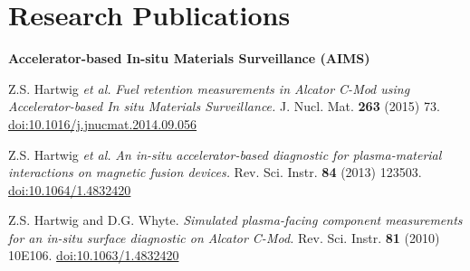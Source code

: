 \documentclass[10pt]{article}
\begin{document}
\section{Research Publications}
\textbf{Accelerator-based In-situ Materials Surveillance (AIMS)}
\begin{innerlist}

\item Z.S. Hartwig \textit{et al.} \textit{Fuel retention measurements
  in Alcator C-Mod using Accelerator-based In situ Materials
  Surveillance.} J. Nucl. Mat. \textbf{263} (2015) 73.
  \href{http://dx.doi.org/10.1016/j.jnucmat.2014.09.056}{doi:10.1016/j.jnucmat.2014.09.056}
  \vspace{0.2cm}

\item Z.S. Hartwig \textit{et al.} \textit{An in-situ
  accelerator-based diagnostic for plasma-material interactions on
  magnetic fusion devices.} Rev. Sci. Instr. \textbf{84} (2013)
  123503.
  \href{http://dx.doi.org/10.1063/1.4832420}{doi:10.1064/1.4832420}
  \vspace{0.2cm}

\item Z.S. Hartwig and D.G. Whyte. \textit{Simulated plasma-facing
  component measurements for an in-situ surface diagnostic on Alcator
  C-Mod.} Rev. Sci. Instr. \textbf{81} (2010)
  10E106.
  \href{http://dx.doi.org/10.1063/1.3478634}{doi:10.1063/1.4832420}
\end{innerlist}

\vspace{0.5cm}
\end{document}
